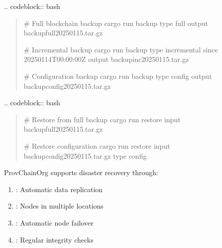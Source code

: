 \documentclass[letterpaper,10pt,english]{sphinxmanual}
\begin{document}
\sphinxAtStartPar
{}
.. code\sphinxhyphen{}block:: bash
\begin{quote}

\sphinxAtStartPar
\# Full blockchain backup
cargo run \textendash{} backup \textendash{}type full \textendash{}output backup\sphinxhyphen{}full\sphinxhyphen{}2025\sphinxhyphen{}01\sphinxhyphen{}15.tar.gz

\sphinxAtStartPar
\# Incremental backup
cargo run \textendash{} backup \textendash{}type incremental \textendash{}since 2025\sphinxhyphen{}01\sphinxhyphen{}14T00:00:00Z \textendash{}output backup\sphinxhyphen{}inc\sphinxhyphen{}2025\sphinxhyphen{}01\sphinxhyphen{}15.tar.gz

\sphinxAtStartPar
\# Configuration backup
cargo run \textendash{} backup \textendash{}type config \textendash{}output backup\sphinxhyphen{}config\sphinxhyphen{}2025\sphinxhyphen{}01\sphinxhyphen{}15.tar.gz
\end{quote}

\sphinxAtStartPar
{}
.. code\sphinxhyphen{}block:: bash
\begin{quote}

\sphinxAtStartPar
\# Restore from full backup
cargo run \textendash{} restore \textendash{}input backup\sphinxhyphen{}full\sphinxhyphen{}2025\sphinxhyphen{}01\sphinxhyphen{}15.tar.gz

\sphinxAtStartPar
\# Restore configuration
cargo run \textendash{} restore \textendash{}input backup\sphinxhyphen{}config\sphinxhyphen{}2025\sphinxhyphen{}01\sphinxhyphen{}15.tar.gz \textendash{}type config
\end{quote}

\sphinxAtStartPar
{}
ProvChainOrg supports disaster recovery through:
\begin{enumerate}
%
\item {} 
\sphinxAtStartPar
{}: Automatic data replication

\item {} 
\sphinxAtStartPar
{}: Nodes in multiple locations

\item {} 
\sphinxAtStartPar
{}: Automatic node failover

\item {} 
\sphinxAtStartPar
{}: Regular integrity checks

\end{enumerate}
\end{document}
